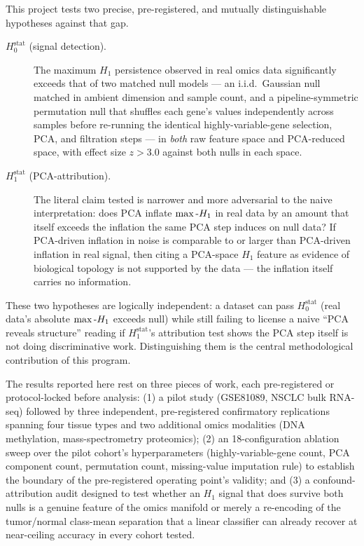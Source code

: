 This project tests two precise, pre-registered, and mutually distinguishable hypotheses against that gap.

\begin{description}
\item[$H_0^{\text{stat}}$ (signal detection).] The maximum $H_1$ persistence observed in real omics data significantly exceeds that of two matched null models --- an i.i.d.\ Gaussian null matched in ambient dimension and sample count, and a pipeline-symmetric permutation null that shuffles each gene's values independently across samples before re-running the identical highly-variable-gene selection, PCA, and filtration steps --- in \emph{both} raw feature space and PCA-reduced space, with effect size $z>3.0$ against both nulls in each space.
\item[$H_1^{\text{stat}}$ (PCA-attribution).] The literal claim tested is narrower and more adversarial to the naive interpretation: does PCA inflate $\max\text{-}H_1$ in real data by an amount that itself exceeds the inflation the same PCA step induces on null data? If PCA-driven inflation in noise is comparable to or larger than PCA-driven inflation in real signal, then citing a PCA-space $H_1$ feature as evidence of biological topology is not supported by the data --- the inflation itself carries no information.
\end{description}

These two hypotheses are logically independent: a dataset can pass $H_0^{\text{stat}}$ (real data's absolute $\max\text{-}H_1$ exceeds null) while still failing to license a naive ``PCA reveals structure'' reading if $H_1^{\text{stat}}$'s attribution test shows the PCA step itself is not doing discriminative work. Distinguishing them is the central methodological contribution of this program.

The results reported here rest on three pieces of work, each pre-registered or protocol-locked before analysis: (1) a pilot study (GSE81089, NSCLC bulk RNA-seq) followed by three independent, pre-registered confirmatory replications spanning four tissue types and two additional omics modalities (DNA methylation, mass-spectrometry proteomics); (2) an 18-configuration ablation sweep over the pilot cohort's hyperparameters (highly-variable-gene count, PCA component count, permutation count, missing-value imputation rule) to establish the boundary of the pre-registered operating point's validity; and (3) a confound-attribution audit designed to test whether an $H_1$ signal that does survive both nulls is a genuine feature of the omics manifold or merely a re-encoding of the tumor/normal class-mean separation that a linear classifier can already recover at near-ceiling accuracy in every cohort tested.

